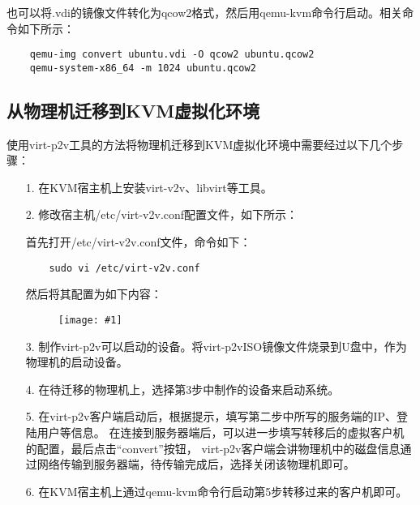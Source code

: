\documentclass[a4paper,left=2.5cm,right=2.5cm,11pt]{article}
\newcommand{\fic}[1]{\begin{figure}[H]
		\center
		\texttt{[image: \#1]}
	\end{figure}}
\begin{document}
	也可以将.vdi的镜像文件转化为qcow2格式，然后用qemu-kvm命令行启动。相关命令如下所示：
	\begin{lstlisting}
	qemu-img convert ubuntu.vdi -O qcow2 ubuntu.qcow2
	qemu-system-x86_64 -m 1024 ubuntu.qcow2
	\end{lstlisting}

\subsection{从物理机迁移到KVM虚拟化环境}
	使用virt-p2v工具的方法将物理机迁移到KVM虚拟化环境中需要经过以下几个步骤：
	\begin{itemize}
		\item[1.] 在KVM宿主机上安装virt-v2v、libvirt等工具。
		\item[2.] 修改宿主机/etc/virt-v2v.conf配置文件，如下所示：\par
		首先打开/etc/virt-v2v.conf文件，命令如下：
		\begin{lstlisting}
	sudo vi /etc/virt-v2v.conf
		\end{lstlisting}

		然后将其配置为如下内容：
		\fic{6.png}

		\item[3.] 制作virt-p2v可以启动的设备。将virt-p2vISO镜像文件烧录到U盘中，作为物理机的启动设备。
		\item[4.] 在待迁移的物理机上，选择第3步中制作的设备来启动系统。
		\item[5.] 在virt-p2v客户端启动后，根据提示，填写第二步中所写的服务端的IP、登陆用户等信息。
		在连接到服务器端后，可以进一步填写转移后的虚拟客户机的配置，最后点击“convert”按钮，
		virt-p2v客户端会讲物理机中的磁盘信息通过网络传输到服务器端，待传输完成后，选择关闭该物理机即可。
		\item[6.] 在KVM宿主机上通过qemu-kvm命令行启动第5步转移过来的客户机即可。
	\end{itemize}
\end{document}
